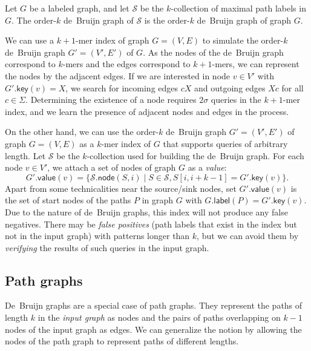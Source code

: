 \documentclass[a4paper,UKenglish]{lipics-v2016}
\newcommand{\set}[1]{\ensuremath{\{ #1 \}}}
\newcommand{\glabel}{\ensuremath{\mathsf{label}}}
\newcommand{\gkey}{\ensuremath{\mathsf{key}}}
\newcommand{\gvalue}{\ensuremath{\mathsf{value}}}
\newcommand{\gnode}{\ensuremath{\mathsf{node}}}
\newcommand{\kmer}[1]{$#1$\nobreakdash-mer}
\newcommand{\kcollection}[1]{$#1$\nobreakdash-collection}
\newcommand{\orderk}[1]{order\nobreakdash-$#1$}
\begin{document}
\begin{definition}
Let $G$ be a labeled graph, and let $\mathcal{S}$ be the \kcollection{k} of maximal path labels in $G$. The \orderk{k} de~Bruijn graph of $\mathcal{S}$ is the \orderk{k} de~Bruijn graph of graph $G$.
\end{definition}

We can use a \kmer{k+1} index of graph $G = (V, E)$ to simulate the \orderk{k} de~Bruijn graph $G' = (V', E')$ of $G$. As the nodes of the de~Bruijn graph correspond to \kmer{k}s and the edges correspond to \kmer{k+1}s, we can represent the nodes by the adjacent edges. If we are interested in node $v \in V'$ with $G'.\gkey(v) = X$, we search for incoming edges $cX$ and outgoing edges $Xc$ for all $c \in \Sigma$. Determining the existence of a node requires $2 \sigma$ queries in the \kmer{k+1} index, and we learn the presence of adjacent nodes and edges in the process.

On the other hand, we can use the \orderk{k} de~Bruijn graph $G' = (V', E')$ of graph $G = (V, E)$ as a \kmer{k} index of $G$ that supports queries of arbitrary length. Let $\mathcal{S}$ be the \kcollection{k} used for building the de~Bruijn graph. For each node $v \in V'$, we attach a set of nodes of graph $G$ as a \emph{value}:
$$
G'.\gvalue(v) = \set{ \mathcal{S}.\gnode(S, i) \mid S \in \mathcal{S}, S[i, i+k-1] = G'.\gkey(v)}.
$$
Apart from some technicalities near the source/sink nodes, set $G'.\gvalue(v)$ is the set of start nodes of the paths $P$ in graph $G$ with $G.\glabel(P) = G'.\gkey(v)$. Due to the nature of de~Bruijn graphs, this index will not produce any false negatives. There may be \emph{false positives} (path labels that exist in the index but not in the input graph) with patterns longer than $k$, but we can avoid them by \emph{verifying} the results of such queries in the input graph.

\subsection{Path graphs}

De~Bruijn graphs are a special case of path graphs. They represent the paths of length $k$ in the \emph{input graph} as nodes and the pairs of paths overlapping on $k-1$ nodes of the input graph as edges. We can generalize the notion by allowing the nodes of the path graph to represent paths of different lengths.
\end{document}
